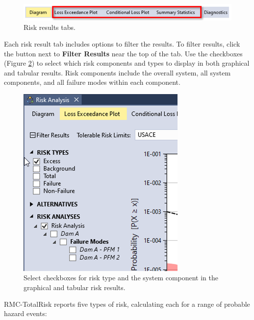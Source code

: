 \documentclass[
]{book}
\begin{document}
\begin{figure}

{\centering \includegraphics{images/figure136} 

}

\caption{Risk results tabs.}\label{fig:figure-136}
\end{figure}

Each risk result tab includes options to filter the results. To filter results, click the button next to \textbf{Filter Results} near the top of the tab. Use the checkboxes (Figure \ref{fig:figure-137}) to select which risk components and types to display in both graphical and tabular results. Risk components include the overall system, all system components, and all failure modes within each component.

\begin{figure}

{\centering \includegraphics{images/figure137} 

}

\caption{Select checkboxes for risk type and the system component in the graphical and tabular risk results.}\label{fig:figure-137}
\end{figure}

RMC-TotalRisk reports five types of risk, calculating each for a range of probable hazard events:
\end{document}

